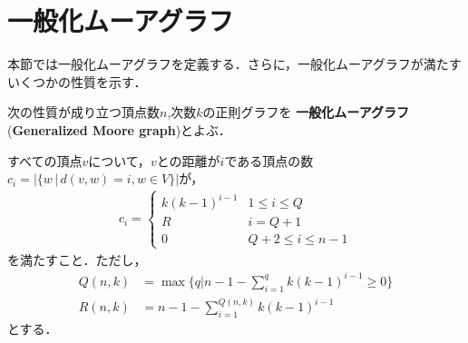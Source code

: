 \section{一般化ムーアグラフ}
\label{sect:generalized-moore-graph}
本節では一般化ムーアグラフを定義する．さらに，一般化ムーアグラフが満たす
いくつかの性質を示す．
\begin{definition}
  \label{def:generalized-moore-graph}
  次の性質が成り立つ頂点数$n$,次数$k$の正則グラフを
  \textbf{一般化ムーアグラフ}(\textbf{Generalized Moore graph})とよぶ．

  すべての頂点$v$について，$v$との距離が$i$である頂点の数
  $c_i = \lvert\{ w\,|\,d(v,w) = i , w\in V \}\rvert$が，
  \begin{equation}
    \label{eq:gmg-verts-dist}
    \begin{aligned}
      c_i =
      \begin{cases}
        k(k-1)^{i-1} & 1\leq i\leq Q \\
        R & i = Q+1 \\
        0 & Q+2\leq i \leq n-1
      \end{cases}
    \end{aligned}
  \end{equation}
  を満たすこと．ただし，
  \begin{align}
    Q(n,k)&=\max\{q|n-1-\sum_{i=1}^{q}k(k-1)^{i-1}\geq 0\}\label{eq:gmg-q} \\
    R(n,k)&=n-1-\sum_{i=1}^{Q(n,k)}k(k-1)^{i-1}\label{eq:gmg-r}
  \end{align}
  とする．
\end{definition}
